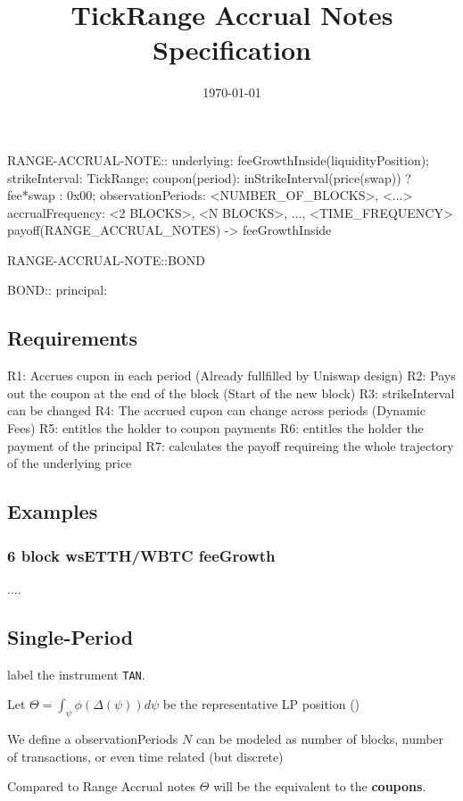 \documentclass[11pt]{article}
\title{TickRange Accrual Notes Specification}
\author{}
\date{\today}
\begin{document}
\maketitle
\tableofcontents

 
RANGE-ACCRUAL-NOTE::
	underlying: feeGrowthInside(liquidityPosition);
	strikeInterval: TickRange;
	coupon(period):  inStrikeInterval(price(swap)) ? fee*swap : 0x00;  
	observationPeriods: <NUMBER_OF_BLOCKS>, <...>
	accrualFrequency: <2 BLOCKS>, <N BLOCKS>, ..., <TIME_FREQUENCY>
	payoff(RANGE_ACCRUAL_NOTES) -> feeGrowthInside


        RANGE-ACCRUAL-NOTE::BOND

        BOND::
	   principal: 

 \subsection{Requirements}

R1: Accrues cupon in each period (Already fullfilled by Uniswap design)
R2: Pays out the coupon at the end of the block (Start of the new block)
R3: strikeInterval can be changed
R4: The accrued cupon can change across periods (Dynamic Fees)
R5: entitles the holder to coupon payments
R6: entitles the holder the payment of the principal
R7: calculates the payoff requireing the whole trajectory of the underlying price
 \subsection{Examples}
 \subsubsection{ 6 block wsETTH/WBTC feeGrowth}
....

 \subsection{Single-Period}

 label the instrument \texttt{TAN}.

 Let \(\Theta = \int_{\psi} \phi (\Delta (\psi)) d\psi\) be the representative LP position ()

 We define a observationPeriods \(N\) can be modeled as number of blocks, number of transactions, or even time related (but discrete)

 Compared to Range Accrual notes \(\Theta\) will be the equivalent to the \textbf{coupons}.
\end{document}
